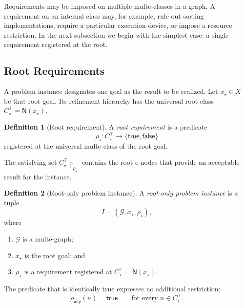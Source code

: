 \documentclass[sigconf,nonacm]{acmart}
\theoremstyle{definition}
\newtheorem{definition}{Definition}[section]
\theoremstyle{plain}
\theoremstyle{remark}
\begin{document}
Requirements may be imposed on multiple multe-classes in a graph.
A requirement on an internal class may, for example, rule out sorting
implementations, require a particular execution device, or impose a
resource restriction.
In the next subsection we begin with the simplest case: a single
requirement registered at the root.

\subsection{Root Requirements}
\label{sec:root-requirements}

A problem instance designates one goal as the result to be realized.
Let \(x_\star\in X\) be that root goal.  Its refinement hierarchy
has the universal root class
\(C^\top_\star = \mathsf N(x_\star)\).

\begin{definition}[Root requirement]
A \emph{root requirement} is a predicate
\[
\rho_\star:
C^\top_\star
\longrightarrow
\{\mathsf{true},\mathsf{false}\}
\]
registered at the universal multe-class of the root goal.
\end{definition}

The satisfying set \(C^\top_\star\!\restriction_{\rho_\star}\)
contains the root e-nodes that provide an acceptable result for the
instance.

\begin{definition}[Root-only problem instance]
A \emph{root-only problem instance} is a tuple
\[
I=(\mathcal G,x_\star,\rho_\star),
\]
where

\begin{enumerate}

\item
\(\mathcal G\) is a multe-graph;

\item
\(x_\star\) is the root goal; and

\item
\(\rho_\star\) is a requirement registered at
\(C^\top_\star=\mathsf N(x_\star)\).

\end{enumerate}
\end{definition}

The predicate that is identically true expresses no additional
restriction:
\[
\rho_{\mathsf{any}}(n)=\mathsf{true}
\qquad
\text{for every }n\in C^\top_\star.
\]
\end{document}
